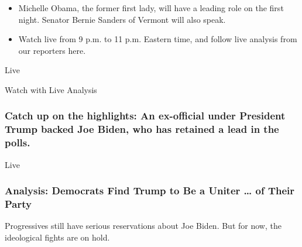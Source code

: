 \href{https://www.nytimes.com/interactive/2020/08/17/us/politics/democratic-national-convention-live-stream-analysis.html}{}

\begin{itemize}
\tightlist
\item
  Michelle Obama, the former first lady, will have a leading role on the
  first night. Senator Bernie Sanders of Vermont will also speak.
\item
  Watch live from 9 p.m. to 11 p.m. Eastern time, and follow live
  analysis from our reporters here.
\end{itemize}

\href{https://www.nytimes.com/interactive/2020/08/17/us/politics/democratic-national-convention-live-stream-analysis.html}{}

Live

Watch with Live Analysis

\href{https://www.nytimes.com/live/2020/08/17/us/dnc-convention}{}

\hypertarget{catch-up-on-the-highlights-an-ex-official-under-president-trump-backed-joe-biden-who-has-retained-a-lead-in-the-polls}{%
\subsubsection{Catch up on the highlights: An ex-official under
President Trump backed Joe Biden, who has retained a lead in the
polls.}\label{catch-up-on-the-highlights-an-ex-official-under-president-trump-backed-joe-biden-who-has-retained-a-lead-in-the-polls}}

Live

\href{https://www.nytimes.com/2020/08/17/us/politics/convention-democratic-night-1.html}{}

\hypertarget{analysis-democrats-find-trump-to-be-a-uniter--of-their-party}{%
\subsubsection{Analysis: Democrats Find Trump to Be a Uniter \ldots{} of
Their
Party}\label{analysis-democrats-find-trump-to-be-a-uniter--of-their-party}}

\href{https://www.nytimes.com/2020/08/17/us/politics/convention-democratic-night-1.html}{}

Progressives still have serious reservations about Joe Biden. But for
now, the ideological fights are on hold.

\href{https://www.nytimes.com/article/republicans-voting-for-biden-not-trump.html}{}

